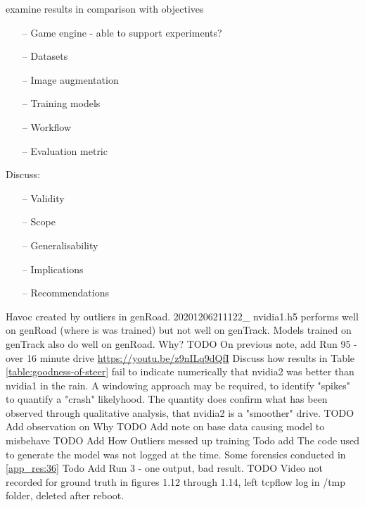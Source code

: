 examine results in comparison with objectives
\begin{itemize}
    \item[--] Game engine - able to support experiments?
    \item[--] Datasets
    \item[--] Image augmentation
    \item[--] Training models
    \item[--] Workflow
    \item[--] Evaluation metric
\end{itemize}
Discuss:
\begin{itemize}
    \item[--] Validity
    \item[--] Scope
    \item[--] Generalisability
    \item[--] Implications
    \item[--] Recommendations
\end{itemize}
Havoc created by outliers in genRoad. 20201206211122\_ nvidia1.h5 performs well on genRoad (where is was trained) but not well on genTrack. Models trained on genTrack also do well on genRoad. Why?
TODO On previous note, add Run 95 - over 16 minute drive \url{https://youtu.be/z9nILq9dQfI}  
Discuss how results in Table \ref{table:goodness-of-steer} fail to indicate numerically that nvidia2 was better than nvidia1 in the rain. A windowing approach may be required, to identify "spikes" to quantify a "crash" likelyhood. The quantity does confirm what has been observed through qualitative analysis, that nvidia2 is a "smoother" drive.  
TODO Add observation on Why
TODO Add note on base data causing model to misbehave
TODO Add How Outliers messed up training
Todo add The code used to generate the model was not logged at the time. Some forensics conducted in \ref{app_res:36}
Todo Add Run 3 - one output, bad result.
TODO Video not recorded for ground truth in figures 1.12 through 1.14, left tcpflow log in /tmp folder, deleted after reboot.
